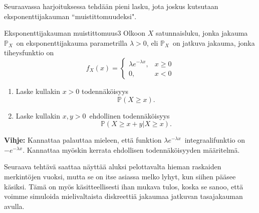 \documentclass[11pt,a4paper]{amsart}
\newcommand{\1}{\mathbf{1}}
\renewcommand{\P}{\mathbb P}
\begin{document}
Seuraavassa harjoituksessa tehdään pieni lasku, jota joskus kutsutaan eksponenttijakauman ``muistittomuudeksi".
\begin{Exercises}{Eksponenttijakauman muistittomuus}{3}
Olkoon  $X$ satunnaisluku, jonka jakauma $\P_X$ on eksponenttijakauma parametrilla $\lambda>0$, eli $\P_X$ on jatkuva jakauma, jonka tiheysfunktio on 
\[
f_X(x)=\begin{cases}
\lambda e^{-\lambda x}, & x\geq 0\\
0, & x<0
\end{cases}
\]
\begin{enumerate}
\item Laske kullakin $x>0$ todennäköisyys 
\[
\P(X\geq x).
\]

\item Laske kullakin $x,y>0$ ehdollinen todennäköisyys 
\[
\P(X\geq x+y|X\geq x).
\]

\end{enumerate}

{\bf Vihje: } Kannattaa palauttaa mieleen, että funktion $\lambda e^{-\lambda x}$ integraalifunktio on $-e^{-\lambda x}$. Kannattaa myöskin kerrata ehdollisen todennäköisyyden määritelmä.
\end{Exercises}

Seuraava tehtävä saattaa näyttää aluksi pelottavalta hieman raskaiden merkintöjen vuoksi, mutta se on itse asiassa melko lyhyt, kun siihen pääsee käsiksi. Tämä on myös käsitteellisesti ihan mukava tulos, koska se sanoo, että voimme simuloida mielivaltaista diskreettiä jakaumaa jatkuvan tasajakauman avulla.
\end{document}
